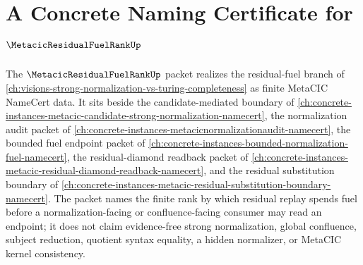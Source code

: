 \chapter{A Concrete Naming Certificate for $\MetacicResidualFuelRankUp$}
\label{ch:concrete-instances-metacic-residual-fuel-rank-namecert}

The $\MetacicResidualFuelRankUp$ packet realizes the residual-fuel branch of \autoref{ch:visions-strong-normalization-vs-turing-completeness} as finite MetaCIC NameCert data. It sits beside the candidate-mediated boundary of \autoref{ch:concrete-instances-metacic-candidate-strong-normalization-namecert}, the normalization audit packet of \autoref{ch:concrete-instances-metacicnormalizationaudit-namecert}, the bounded fuel endpoint packet of \autoref{ch:concrete-instances-bounded-normalization-fuel-namecert}, the residual-diamond readback packet of \autoref{ch:concrete-instances-metacic-residual-diamond-readback-namecert}, and the residual substitution boundary of \autoref{ch:concrete-instances-metacic-residual-substitution-boundary-namecert}. The packet names the finite rank by which residual replay spends fuel before a normalization-facing or confluence-facing consumer may read an endpoint; it does not claim evidence-free strong normalization, global confluence, subject reduction, quotient syntax equality, a hidden normalizer, or MetaCIC kernel consistency.

